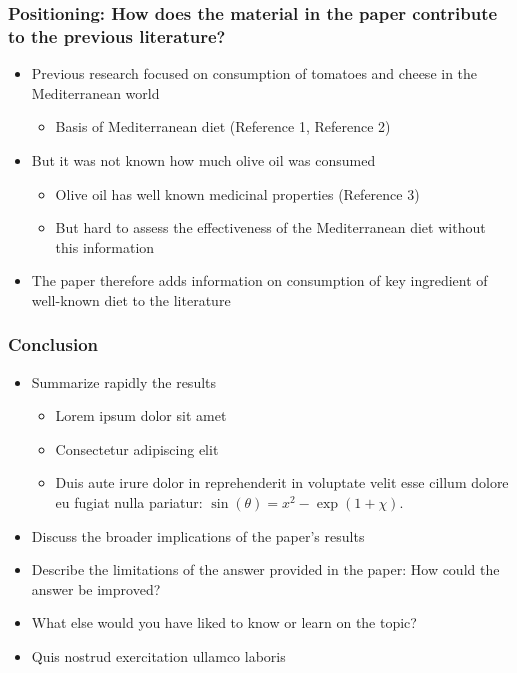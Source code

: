\documentclass[11pt,xcolor={dvipsnames},hyperref={pdftex,pdfpagemode=UseNone,hidelinks,pdfdisplaydoctitle=true},usepdftitle=false]{beamer}
\begin{document}
\begin{frame}
\frametitle{Positioning: How does the material in the paper contribute to the previous  literature?}
\begin{itemize}
\item Previous research focused on consumption of tomatoes and cheese in the Mediterranean world
\begin{itemize}
\item Basis of Mediterranean diet (Reference 1, Reference 2)
\end{itemize}
\item But it was not known how much olive oil was consumed 
\begin{itemize}
\item Olive oil has well known medicinal properties (Reference 3)
\item[\then] But hard to assess the effectiveness of the Mediterranean diet without this information
\end{itemize}
\item The paper therefore adds information on consumption of key ingredient of well-known diet to the literature
\end{itemize}	
\end{frame}

\begin{frame}
\frametitle{Conclusion}
\begin{itemize}
\item Summarize rapidly the results
\begin{itemize}
\item Lorem ipsum dolor sit amet
\item Consectetur adipiscing elit
\item Duis aute irure dolor in reprehenderit in voluptate velit esse cillum dolore eu fugiat nulla pariatur: $\sin(\theta) = x^2 - \exp(1+\chi)$. 
\end{itemize}
\item Discuss the broader implications of the paper's results	
\item Describe the limitations of the answer provided in the paper: How could the answer be improved? 
\item What else would you have liked to know or learn on the topic?
\item Quis nostrud exercitation ullamco laboris
\end{itemize}	
\end{frame}
\end{document}
